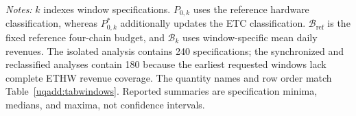 \begin{table}[H]
\begin{tabularx}{\textwidth}{
@{}
>{\raggedright\arraybackslash}p{2.3cm}
>{\raggedright\arraybackslash}p{2.8cm}
>{\raggedright\arraybackslash}X
>{\raggedright\arraybackslash}X
@{}
}
\bottomrule
\end{tabularx}

\par\smallskip
\begin{minipage}{\textwidth}
\footnotesize
\textit{Notes:}
$k$ indexes window specifications.
$P_{0,k}$ uses the reference hardware classification,
whereas $P^{*}_{0,k}$ additionally updates the ETC classification.
$\mathcal B_{\mathrm{ref}}$ is the fixed reference four-chain budget,
and $\mathcal B_k$ uses window-specific mean daily revenues.
The isolated analysis contains 240 specifications;
the synchronized and reclassified analyses contain 180
because the earliest requested windows lack complete
ETHW revenue coverage.
The quantity names and row order match
Table~\ref{uqadd:tabwindows}.
Reported summaries are specification minima,
medians, and maxima, not confidence intervals.
\end{minipage}
\end{table}

